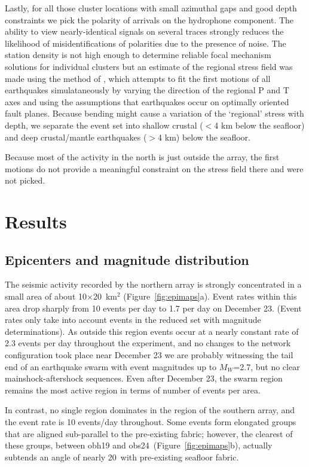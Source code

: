 \documentclass[reviewcopy]{elsarticle}
\begin{document}
Lastly, for all those cluster locations
with small azimuthal
gaps and good depth constraints we pick the polarity of arrivals on the hydrophone
component. The ability to view nearly-identical signals on several
traces strongly reduces the likelihood of misidentifications of
polarities due to the presence of noise. The station density is not
high enough to determine reliable focal mechanism solutions for
individual clusters but an estimate of the regional stress field was
made using the method of \citet{robinson00}, which attempts to fit the
first motions of all earthquakes simulataneously by varying the
direction of the regional P and T axes and using the assumptions that earthquakes
occur on optimally oriented fault planes.  Because bending might cause
a variation of the `regional' stress with depth, we separate the event set
into shallow crustal ($<$4 km below the seafloor) and deep
crustal/mantle earthquakes ($>$4 km) below the seafloor.

Because most of the activity in the north is just outside the array,
the first motions do not provide a meaningful constraint on the
stress field there and were not picked.

\section{Results}

\subsection{Epicenters and magnitude distribution}

The seismic activity recorded by the northern array is strongly
concentrated in a small area of about 10$\times$20~km$^2$
(Figure~\ref{fig:epimaps}a).  Event
rates within this area drop sharply from 10 events per day to 1.7 per
day on December
23. (Event rates only take into account events in the reduced set with
magnitude
determinations).  As outside this region events occur at  a nearly constant rate of
2.3 events per day throughout the experiment, and no  changes to the network configuration took
place near December 23 we are probably witnessing the tail end of an
earthquake swarm with event magnitudes up to $M_W$=2.7, but no clear
mainshock-aftershock sequences.   Even after December 23, the swarm
region remains the most active region in terms of number of events per
area.

In contrast, no single region dominates in the region of the southern
array, and the event rate is 10
events/day throughout.  Some events form elongated groups that are
aligned sub-parallel to the pre-existing fabric; however, the clearest
of these groups,
between obh19 and obs24~(Figure~\ref{fig:epimaps}b), actually subtends an angle
of nearly 20\dg\ with pre-existing seafloor fabric.
\end{document}
